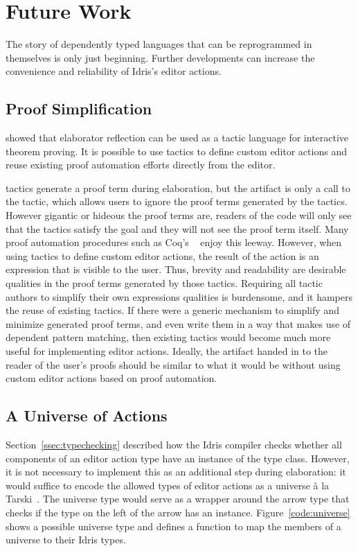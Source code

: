 \section{Future Work}

The story of dependently typed languages that can be reprogrammed in
themselves is only just beginning. Further developments can increase
the convenience and reliability of Idris's editor actions.

\subsection{Proof Simplification}
\label{sssec:simplification}

\citet{elabref} showed that elaborator reflection can be used as a
tactic language for interactive theorem proving. It is possible to use
\Elab{} tactics to define custom editor actions and reuse existing
proof automation efforts directly from the editor.

\Elab{} tactics generate a proof term during elaboration, but the
artifact is only a call to the tactic, which allows users to ignore
the proof terms generated by the tactics. However gigantic or hideous
the proof terms are, readers of the code will only see that the
tactics satisfy the goal and they will not see the proof term
itself. Many proof automation procedures such as Coq's
~\cite{omega} enjoy this leeway.  However, when using
\Elab{} tactics to define custom editor actions, the result of the
action is an expression that is visible to the user. Thus, brevity and
readability are desirable qualities in the proof terms generated by
those tactics.  Requiring all tactic authors to simplify their own
expressions qualities is burdensome, and it hampers the reuse of
existing tactics.  If there were a generic mechanism to simplify and
minimize generated proof terms, and even write them in a way that
makes use of dependent pattern matching, then existing tactics would become
much more useful for implementing editor actions. Ideally, the
artifact handed in to the reader of the user's proofs should be similar
to what it would be without using custom editor actions based on proof
automation.

\subsection{A Universe of Actions}
\label{sssec:universeEncoding}

Section~\ref{ssec:typechecking} described how the Idris compiler
checks whether all components of an editor action type have an
instance of the \Editorable{} type class. However, it is not necessary
to implement this as an additional step during elaboration: it would suffice to
encode the allowed types of editor actions as a universe à la
Tarski~\cite{genericDep}.  The universe type would serve as a wrapper around the
arrow type that checks if the type on the left of the arrow has an
\Editorable{} instance. Figure~\ref{code:universe} shows a possible
universe type and defines a function to map the members of a universe
to their Idris types.

